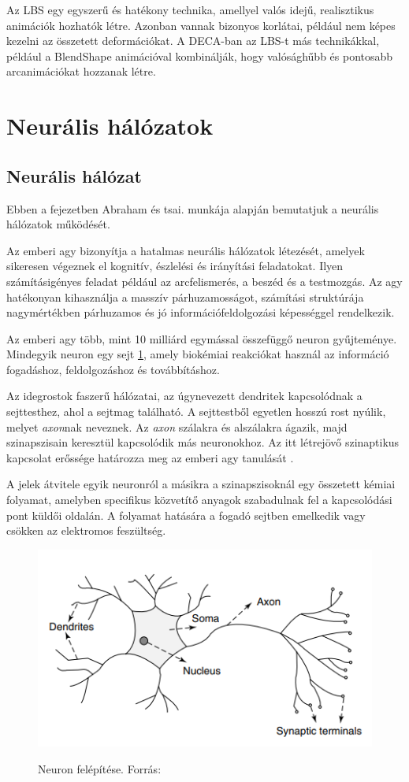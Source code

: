 \documentclass[12pt,a4]{article}
\begin{document}
Az LBS egy egyszerű és hatékony technika, amellyel valós idejű, realisztikus animációk hozhatók létre. 
Azonban vannak bizonyos korlátai, például nem képes kezelni az összetett deformációkat. 
A DECA-ban az LBS-t más technikákkal, például a BlendShape animációval kombinálják, hogy valósághűbb és pontosabb arcanimációkat hozzanak létre.

 
	\section{Neurális hálózatok}
	\subsection{Neurális hálózat}
    Ebben a fejezetben Abraham és tsai. munkája alapján bemutatjuk a neurális hálózatok működését.
    
	\label{NN}
	Az emberi agy bizonyítja a hatalmas neurális hálózatok létezését, amelyek sikeresen végeznek el kognitív, észlelési és irányítási feladatokat. Ilyen számításigényes feladat például az arcfelismerés, a beszéd és a testmozgás. Az agy hatékonyan kihasználja a masszív párhuzamosságot, számítási struktúrája nagymértékben párhuzamos és jó információfeldolgozási képességgel rendelkezik.
	
	Az emberi agy több, mint 10 milliárd egymással összefüggő neuron gyűjteménye. Mindegyik neuron egy sejt \ref{fig:neuron1}, amely biokémiai reakciókat használ az információ fogadáshoz, feldolgozáshoz és továbbításhoz.
	
	Az idegrostok faszerű hálózatai, az úgynevezett dendritek kapcsolódnak a sejttesthez, ahol a sejtmag található. A sejttestből egyetlen hosszú rost nyúlik, melyet \textit{axon}nak neveznek. Az \textit{axon} szálakra és alszálakra ágazik, majd szinapszisain keresztül kapcsolódik más neuronokhoz. Az itt létrejövő szinaptikus kapcsolat erőssége határozza meg az emberi agy tanulását\cite{ann} .
	
	A jelek átvitele egyik neuronról a másikra a szinapszisoknál egy összetett kémiai folyamat, amelyben specifikus közvetítő anyagok szabadulnak fel a kapcsolódási pont küldői oldalán. A folyamat hatására a fogadó sejtben emelkedik vagy csökken az elektromos feszültség.
	\begin{figure}[h]	
		\centering
		\includegraphics[width=1\linewidth]{neuron1}
        \label{fig:neuron1}
		\caption{Neuron felépítése. 
			Forrás:\cite{ann}}
	\end{figure}
	\newpage
\end{document}
